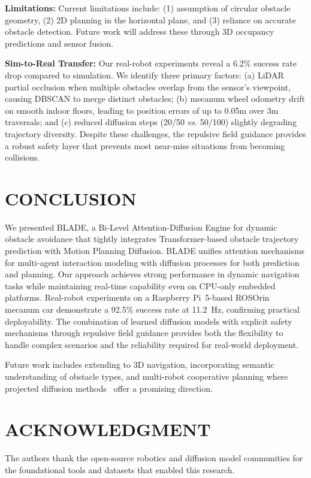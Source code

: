 \documentclass[letterpaper, 10 pt, conference]{ieeeconf}
\begin{document}
\textbf{Limitations:} Current limitations include: (1) assumption of circular obstacle geometry, (2) 2D planning in the horizontal plane, and (3) reliance on accurate obstacle detection. Future work will address these through 3D occupancy predictions and sensor fusion.

\textbf{Sim-to-Real Transfer:} Our real-robot experiments reveal a 6.2\% success rate drop compared to simulation. We identify three primary factors: (a) LiDAR partial occlusion when multiple obstacles overlap from the sensor's viewpoint, causing DBSCAN to merge distinct obstacles; (b) mecanum wheel odometry drift on smooth indoor floors, leading to position errors of up to 0.05m over 3m traversals; and (c) reduced diffusion steps (20/50 \textit{vs.} 50/100) slightly degrading trajectory diversity. Despite these challenges, the repulsive field guidance provides a robust safety layer that prevents most near-miss situations from becoming collisions.

\section{CONCLUSION}

We presented BLADE, a Bi-Level Attention-Diffusion Engine for dynamic obstacle avoidance that tightly integrates Transformer-based obstacle trajectory prediction with Motion Planning Diffusion. BLADE unifies attention mechanisms for multi-agent interaction modeling with diffusion processes for both prediction and planning. Our approach achieves strong performance in dynamic navigation tasks while maintaining real-time capability even on CPU-only embedded platforms. Real-robot experiments on a Raspberry Pi~5-based ROSOrin mecanum car demonstrate a 92.5\% success rate at 11.2~Hz, confirming practical deployability. The combination of learned diffusion models with explicit safety mechanisms through repulsive field guidance provides both the flexibility to handle complex scenarios and the reliability required for real-world deployment.

Future work includes extending to 3D navigation, incorporating semantic understanding of obstacle types, and multi-robot cooperative planning where projected diffusion methods~\cite{liang2025multirobot} offer a promising direction.

\section*{ACKNOWLEDGMENT}

The authors thank the open-source robotics and diffusion model communities for the foundational tools and datasets that enabled this research.

\addtolength{\textheight}{4cm}



\end{document}
